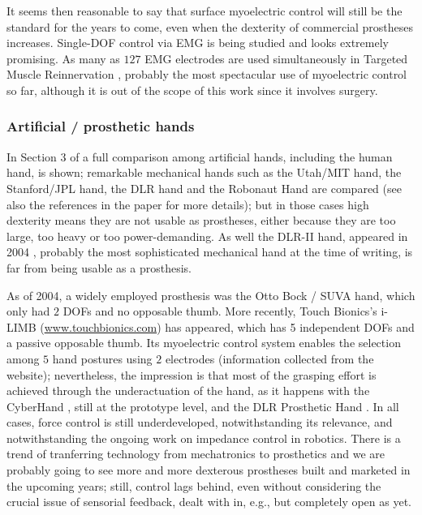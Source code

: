 It seems then reasonable to say that surface myoelectric control will still be the
standard for the years to come, even when the dexterity of commercial prostheses
increases. Single-DOF control via EMG is being studied \cite{englehart08} and looks
extremely promising. As many as $127$ EMG electrodes are used simultaneously in Targeted
Muscle Reinnervation \cite{kuiken06}, probably the most spectacular use of myoelectric control
so far, although it is out of the scope of this work since it involves surgery.

\subsubsection{Artificial / prosthetic hands}

In Section $3$ of \cite{zecca02} a full comparison among artificial hands, including
the human hand, is shown; remarkable mechanical hands such as the Utah/MIT hand, the
Stanford/JPL hand, the DLR hand and the Robonaut Hand are compared (see also the
references in the paper for more details); but in those cases high dexterity means they
are not usable as prostheses, either because they are too large, too heavy or too power-demanding.
As well the DLR-II hand, appeared in 2004 \cite{ButFisGre2004}, probably the most sophisticated
mechanical hand at the time of writing, is far from being usable as a prosthesis.

As of 2004, a widely employed prosthesis was the Otto Bock / SUVA hand, which only had $2$ DOFs and
no opposable thumb. More recently, Touch Bionics's i-LIMB (\url{www.touchbionics.com}) has appeared, which has
5 independent DOFs and a passive opposable thumb. Its myoelectric control system enables
the selection among $5$ hand postures using $2$ electrodes (information collected from the
website); nevertheless, the impression is that most of the grasping effort is achieved through
the underactuation of the hand, as it happens with the CyberHand \cite{cyberhand}, still at
the prototype level, and the DLR Prosthetic Hand \cite{Hua2006}. In all cases, force control
is still underdeveloped, notwithstanding its relevance, and notwithstanding the ongoing work
on impedance control \cite{ott} in robotics. There is a trend of tranferring technology from
mechatronics to prosthetics and we are probably going to see more and more dexterous
prostheses built and marketed in the upcoming years; still, control
lags behind, even without considering the crucial issue of sensorial feedback,
dealt with in, e.g., \cite{cipriani} but completely open as yet.

